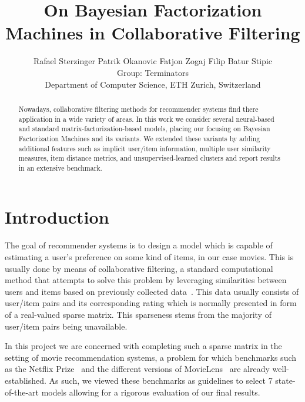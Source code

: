 \documentclass[10pt,conference,compsocconf]{IEEEtran}
\newcommand{\spacing}{\hspace{1cm}}
\begin{document}
    \setlength{\abovedisplayskip}{2pt}
    \setlength{\belowdisplayskip}{2pt}
    \setlength{\abovedisplayshortskip}{2pt}
    \setlength{\belowdisplayshortskip}{2pt}
    \title{On Bayesian Factorization Machines in Collaborative Filtering}

    \author{
        Rafael Sterzinger \spacing Patrik Okanovic \spacing Fatjon Zogaj \spacing Filip Batur Stipic\\
        Group: Terminators\\
        Department of Computer Science, ETH Zurich, Switzerland
    }

    \maketitle

    \begin{abstract}
        Nowadays, collaborative filtering methods for recommender systems find there application in a wide variety of areas.
        In this work we consider several neural-based and standard matrix-factorization-based models, placing our focusing on Bayesian Factorization Machines and its variants.
        We extended these variants by adding additional features such as implicit user/item information, multiple user similarity measures, item distance metrics, and unsupervised-learned clusters and report results in an extensive benchmark.
    \end{abstract}


    \section{Introduction}

    The goal of recommender systems is to design a model which is capable of estimating a user's preference on some kind of items, in our case movies.
    This is usually done by means of collaborative filtering, a standard computational method that attempts to solve this problem by leveraging similarities between users and items based on previously collected data~\cite{CF_survey}.
    This data usually consists of user/item pairs and its corresponding rating which is normally presented in form of a real-valued sparse matrix.
    This sparseness stems from the majority of user/item pairs being unavailable.

    In this project we are concerned with completing such a sparse matrix in the setting of movie recommendation systems, a problem for which benchmarks such as the Netflix Prize~\cite{Netflix} and the different versions of MovieLens~\cite{Movielens} are already well-established.
    As such, we viewed these benchmarks as guidelines to select 7 state-of-the-art models allowing for a rigorous evaluation of our final results.
\end{document}
